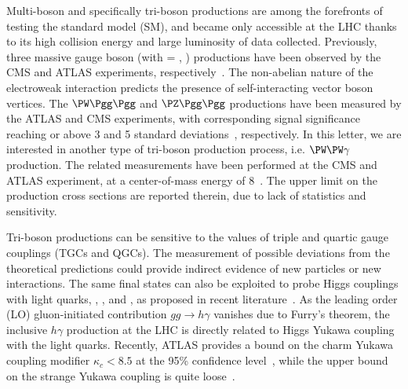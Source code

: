 \documentclass[11pt,twoside,a4paper,cmspaper]{cms-tdr}
\begin{document}

\maketitle 

Multi-boson and specifically tri-boson productions are among the forefronts of testing the standard model (SM), and became only accessible at the LHC thanks to its high collision energy and large luminosity of data collected. Previously, three massive gauge boson (\PV\PV\PV with \PV = \PW, \PZ) productions have been observed by the CMS and ATLAS experiments, respectively~\cite{CMS:2020hjs,ATLAS:2021atz}. The non-abelian nature of the electroweak interaction predicts the presence of self-interacting vector boson vertices. The $\PW\Pgg\Pgg$ and $\PZ\Pgg\Pgg$ productions have been measured by the ATLAS and CMS experiments, with corresponding signal significance reaching or above 3 and 5 standard deviations~\cite{ATLAS:2015ify,ATLAS:2016qjc,CMS:2017tzy,CMS:2021jji}, respectively. In this letter, we are interested in another type of tri-boson production process, i.e. $\PW\PW\gamma$ production. The related measurements have been performed at the CMS and ATLAS experiment, at a center-of-mass energy of 8\TeV~\cite{CMS:2014cdf,ATLAS:2017bon}. The upper limit on the production cross sections are reported therein, due to lack of statistics and sensitivity.

Tri-boson productions can be sensitive to the values of triple and quartic gauge couplings (TGCs and QGCs). The measurement of possible deviations from the theoretical predictions could provide indirect evidence of new particles or new interactions. The same final states can also be exploited to probe Higgs couplings with light quarks, \PQc, \PQs, \PQu and \PQd, as proposed in recent literature~\cite{Khanpour:2017inb,Aguilar-Saavedra:2020rgo,Falkowski:2020znk}. As the leading order (LO) gluon-initiated contribution $gg\rightarrow h\gamma$ vanishes due to Furry’s theorem, the inclusive $h\gamma$ production at the LHC is directly related to Higgs Yukawa coupling with the light quarks. Recently, ATLAS provides a bound on the charm Yukawa coupling modifier $\kappa_c<8.5$ at the 95\% confidence level~\cite{ATLAS:2021zwx}, while the upper bound on the strange Yukawa coupling is quite loose~\cite{Duarte-Campderros:2018ouv,ATLAS:2018xfc}.
\end{document}
